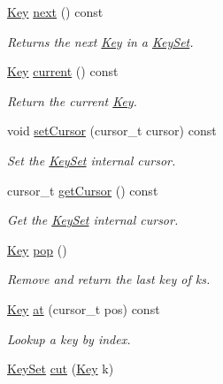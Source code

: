 \begin{DoxyCompactItemize}
\mbox{\hyperlink{classkdb_1_1Key}{Key}} \mbox{\hyperlink{classkdb_1_1KeySet_affd52d130faf184361297f9e7f0c9f16}{next}} () const
\begin{DoxyCompactList}\small\item\em Returns the next \mbox{\hyperlink{classkdb_1_1Key}{Key}} in a \mbox{\hyperlink{classkdb_1_1KeySet}{Key\+Set}}. \end{DoxyCompactList}\item 
\mbox{\hyperlink{classkdb_1_1Key}{Key}} \mbox{\hyperlink{classkdb_1_1KeySet_a0a0fc4efecd6dcbfde5fc35301b60349}{current}} () const
\begin{DoxyCompactList}\small\item\em Return the current \mbox{\hyperlink{classkdb_1_1Key}{Key}}. \end{DoxyCompactList}\item 
void \mbox{\hyperlink{classkdb_1_1KeySet_a716d522e1f64e53d4f9706b5d71bb1b5}{set\+Cursor}} (cursor\+\_\+t cursor) const
\begin{DoxyCompactList}\small\item\em Set the \mbox{\hyperlink{classkdb_1_1KeySet}{Key\+Set}} internal cursor. \end{DoxyCompactList}\item 
cursor\+\_\+t \mbox{\hyperlink{classkdb_1_1KeySet_a6f93621c0baab89dfa122391e3117f34}{get\+Cursor}} () const
\begin{DoxyCompactList}\small\item\em Get the \mbox{\hyperlink{classkdb_1_1KeySet}{Key\+Set}} internal cursor. \end{DoxyCompactList}\item 
\mbox{\hyperlink{classkdb_1_1Key}{Key}} \mbox{\hyperlink{classkdb_1_1KeySet_a7f207457a1c12633a1a5301a3a1bbaed}{pop}} ()
\begin{DoxyCompactList}\small\item\em Remove and return the last key of {\ttfamily ks}. \end{DoxyCompactList}\item 
\mbox{\hyperlink{classkdb_1_1Key}{Key}} \mbox{\hyperlink{classkdb_1_1KeySet_ab2821dd5568636f5e789e49562c7da21}{at}} (cursor\+\_\+t pos) const
\begin{DoxyCompactList}\small\item\em Lookup a key by index. \end{DoxyCompactList}\item 
\mbox{\hyperlink{classkdb_1_1KeySet}{Key\+Set}} \mbox{\hyperlink{classkdb_1_1KeySet_ab283da798a7670d5c3f0e1a5b821e666}{cut}} (\mbox{\hyperlink{classkdb_1_1Key}{Key}} k)

\end{DoxyCompactItemize}
